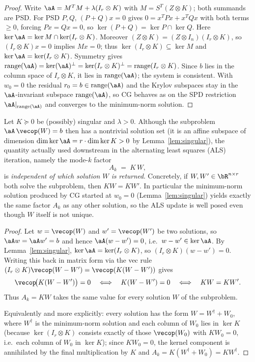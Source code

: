\begin{proof}
Write $\aA=M^{T}M+\lambda(I_r\otimes K)$ with $M=S^{T}(Z\otimes K)$; both
summands are PSD. For PSD $P,Q$, $(P+Q)x=0$ gives
$0=x^{T}Px+x^{T}Qx$ with both terms $\ge0$, forcing $Px=Qx=0$, so
$\ker(P+Q)=\ker P\cap\ker Q$. Here
$\ker\aA=\ker M\cap\ker(I_r\otimes K)$. Moreover
$(Z\otimes K)=(Z\otimes I_n)(I_r\otimes K)$, so $(I_r\otimes K)x=0$ implies
$Mx=0$; thus $\ker(I_r\otimes K)\subseteq\ker M$ and
$\ker\aA=\ker(I_r\otimes K)$. Symmetry gives
$\operatorname{range}(\aA)=\ker(\aA)^{\perp}=\ker(I_r\otimes K)^{\perp}
=\operatorname{range}(I_r\otimes K)$. Since $b$ lies in the column space of
$I_r\otimes K$, it lies in $\operatorname{range}(\aA)$; the system is
consistent. With $w_0=0$ the residual $r_0=b\in\operatorname{range}(\aA)$ and
the Krylov subspaces stay in the $\aA$-invariant subspace
$\operatorname{range}(\aA)$, so CG behaves as on the SPD restriction
$\aA|_{\operatorname{range}(\aA)}$ and converges to the minimum-norm solution.
\end{proof}

\begin{lemma}[The ALS factor $A_k=KW$ is well defined under singular $K$]
\label{lem:welldef}
Let $K\succeq0$ be (possibly) singular and $\lambda>0$. Although the
subproblem $\aA\,\vecop(W)=b$ then has a nontrivial solution set (it is an
affine subspace of dimension $\dim\ker\aA=r\cdot\dim\ker K>0$ by
Lemma~\ref{lem:singular}), the quantity actually used downstream in the
alternating least squares (ALS) iteration, namely the mode-$k$ factor
\[
  A_k \;=\; K\,W,
\]
is \emph{independent of which solution $W$ is returned}. Concretely, if
$W,W'\in\bR^{n\times r}$ both solve the subproblem, then $KW=KW'$. In
particular the minimum-norm solution produced by CG started at $w_0=0$
(Lemma~\ref{lem:singular}) yields exactly the same factor $A_k$ as any other
solution, so the ALS update is well posed even though $W$ itself is not unique.
\end{lemma}

\begin{proof}
Let $w=\vecop(W)$ and $w'=\vecop(W')$ be two solutions, so
$\aA w=\aA w'=b$ and hence $\aA(w-w')=0$, i.e.\ $w-w'\in\ker\aA$. By
Lemma~\ref{lem:singular}, $\ker\aA=\ker(I_r\otimes K)$, so
$(I_r\otimes K)(w-w')=0$. Writing this back in matrix form via the vec rule
$(I_r\otimes K)\vecop(W-W')=\vecop(K(W-W'))$ gives
\[
  \vecop\!\bigl(K(W-W')\bigr)=0
  \quad\Longleftrightarrow\quad
  K(W-W')=0
  \quad\Longleftrightarrow\quad
  KW=KW' .
\]
Thus $A_k=KW$ takes the same value for every solution $W$ of the subproblem.

Equivalently and more explicitly: every solution has the form
$W=W^{\dagger}+W_0$, where $W^{\dagger}$ is the minimum-norm solution and each
column of $W_0$ lies in $\ker K$ (because $\ker(I_r\otimes K)$ consists exactly
of those $\vecop(W_0)$ with $KW_0=0$, i.e.\ each column of $W_0$ in $\ker K$);
since $KW_0=0$, the kernel component is annihilated by the final multiplication
by $K$ and $A_k=K(W^{\dagger}+W_0)=KW^{\dagger}$.
\end{proof}

